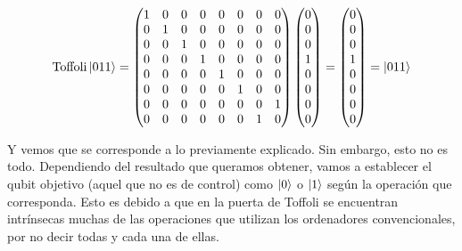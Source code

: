 \documentclass{article}
\numberwithin{equation}{section} %
\begin{document}
    \begin{equation*}
        \text{Toffoli} \ket{0 1 1} = \begin{pmatrix}
            1 & 0 & 0 & 0 & 0 & 0 & 0 & 0 \\
            0 & 1 & 0 & 0 & 0 & 0 & 0 & 0 \\
            0 & 0 & 1 & 0 & 0 & 0 & 0 & 0 \\
            0 & 0 & 0 & 1 & 0 & 0 & 0 & 0 \\
            0 & 0 & 0 & 0 & 1 & 0 & 0 & 0 \\
            0 & 0 & 0 & 0 & 0 & 1 & 0 & 0 \\
            0 & 0 & 0 & 0 & 0 & 0 & 0 & 1 \\
            0 & 0 & 0 & 0 & 0 & 0 & 1 & 0 
        \end{pmatrix} \begin{pmatrix}
            0 \\
            0 \\
            0 \\
            1 \\
            0 \\
            0 \\
            0 \\
            0
        \end{pmatrix} = \begin{pmatrix}
            0 \\
            0 \\
            0 \\
            1 \\
            0 \\
            0 \\
            0 \\
            0
        \end{pmatrix} = \ket{0 1 1}
    \end{equation*}

    \vspace{2.5mm}

    Y vemos que se corresponde a lo previamente explicado. Sin embargo, esto no es todo. Dependiendo del resultado que queramos obtener, vamos a establecer el qubit objetivo (aquel que no es de control) como \( \ket{0} \) o \( \ket{1} \) según la operación que corresponda. Esto es debido a que en la puerta de Toffoli se encuentran intrínsecas muchas de las operaciones que utilizan los ordenadores convencionales, por no decir todas y cada una de ellas.
    
\end{document}
